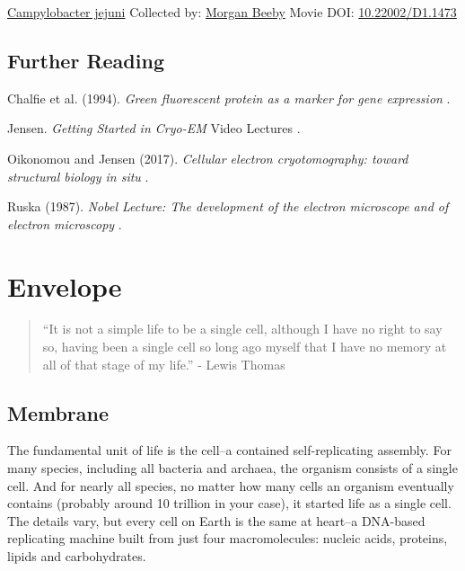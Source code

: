 \documentclass[]{tufte-book}
\begin{document}
\hypertarget{htmlwidget-dfbf76304ed1f7ace80b}{}

\label{fig:1-10a}\protect\hyperlink{tree}{Campylobacter jejuni} Collected by: \protect\hyperlink{morgan_beeby}{Morgan Beeby} Movie DOI: \href{https://doi.org/10.22002/D1.1473}{10.22002/D1.1473}

\hypertarget{further-reading}{%
\section{Further Reading}\label{further-reading}}

Chalfie et al. (1994). \emph{Green fluorescent protein as a marker for gene expression} \citep{chalfie1994}.

Jensen. \emph{Getting Started in Cryo-EM} Video Lectures \citep{jensenInternet}.

Oikonomou and Jensen (2017). \emph{Cellular electron cryotomography: toward structural biology in situ} \citep{oikonomou2017}.

Ruska (1987). \emph{Nobel Lecture: The development of the electron microscope and of electron microscopy} \citep{ruska1987}.

\hypertarget{envelope}{%
\chapter{Envelope}\label{envelope}}

\begin{quote}
``It is not a simple life to be a single cell, although I have no right to say so, having been a single cell so long ago myself that I have no memory at all of that stage of my life.''
- Lewis Thomas \citep{thomas1990}
\end{quote}

\hypertarget{membrane}{%
\section{Membrane}\label{membrane}}

The fundamental unit of life is the cell--a contained self-replicating assembly. For many species, including all bacteria and archaea, the organism consists of a single cell. And for nearly all species, no matter how many cells an organism eventually contains (probably around 10 trillion in your case), it started life as a single cell. The details vary, but every cell on Earth is the same at heart--a DNA-based replicating machine built from just four macromolecules: nucleic acids, proteins, lipids and carbohydrates.
\end{document}
